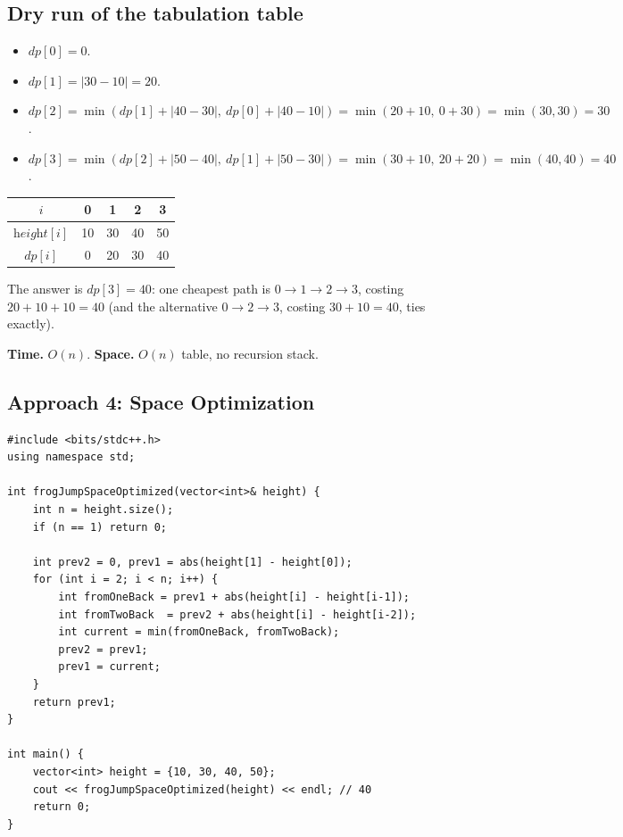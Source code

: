 \subsection*{Dry run of the tabulation table}


\begin{itemize}
  \item $\textit{dp}[0] = 0$.
  \item $\textit{dp}[1] = |30-10| = 20$.
  \item $\textit{dp}[2] = \min(\textit{dp}[1]+|40{-}30|,\
        \textit{dp}[0]+|40{-}10|) = \min(20{+}10,\ 0{+}30) =
        \min(30,30) = 30$.
  \item $\textit{dp}[3] = \min(\textit{dp}[2]+|50{-}40|,\
        \textit{dp}[1]+|50{-}30|) = \min(30{+}10,\ 20{+}20) =
        \min(40,40) = 40$.
\end{itemize}

\begin{center}
\begin{tabular}{c|c|c|c|c}
$i$ & 0 & 1 & 2 & 3 \\ \hline
$\textit{height}[i]$ & 10 & 30 & 40 & 50 \\ \hline
$\textit{dp}[i]$ & 0 & 20 & 30 & 40
\end{tabular}
\end{center}

The answer is $\textit{dp}[3]=40$: one cheapest path is
$0\to1\to2\to3$, costing $20+10+10=40$ (and the alternative
$0\to2\to3$, costing $30+10=40$, ties exactly).

\begin{complexitybox}
\textbf{Time.} $O(n)$.
\textbf{Space.} $O(n)$ table, no recursion stack.
\end{complexitybox}

\subsection*{Approach 4: Space Optimization}

\begin{lstlisting}
#include <bits/stdc++.h>
using namespace std;

int frogJumpSpaceOptimized(vector<int>& height) {
    int n = height.size();
    if (n == 1) return 0;

    int prev2 = 0, prev1 = abs(height[1] - height[0]);
    for (int i = 2; i < n; i++) {
        int fromOneBack = prev1 + abs(height[i] - height[i-1]);
        int fromTwoBack  = prev2 + abs(height[i] - height[i-2]);
        int current = min(fromOneBack, fromTwoBack);
        prev2 = prev1;
        prev1 = current;
    }
    return prev1;
}

int main() {
    vector<int> height = {10, 30, 40, 50};
    cout << frogJumpSpaceOptimized(height) << endl; // 40
    return 0;
}
\end{lstlisting}

